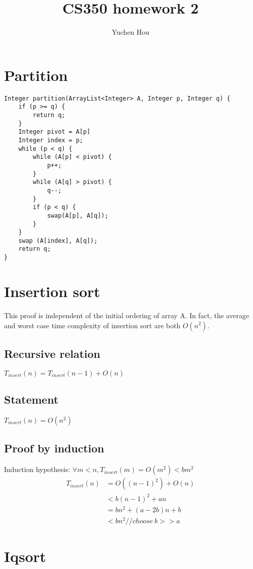 \documentclass{article}
\begin{document}
\lstset{language=Java, tabsize=4}
\title{CS350 homework 2}
\author{Yuchen Hou}
\maketitle

\section{Partition}
\begin{lstlisting}
Integer partition(ArrayList<Integer> A, Integer p, Integer q) {
	if (p >= q) {
		return q;
	}
	Integer pivot = A[p]
	Integer index = p;
	while (p < q) {
		while (A[p] < pivot) {
			p++;
		}
		while (A[q] > pivot) {
			q--;
		}
		if (p < q) {
			swap(A[p], A[q]);
		}
	}
	swap (A[index], A[q]);
	return q;
}
\end{lstlisting}

\section{Insertion sort}
This proof is independent of the initial ordering of array A. In fact, the
average and worst case time complexity of insertion sort are both $O(n^2)$.

\subsection{Recursive relation}
$T_{insert}(n) = T_{insert}(n - 1) + O(n)$

\subsection{Statement}
$T_{insert}(n) = O(n^2)$

\subsection{Proof by induction}
Induction hypothesis: $\forall m < n, T_{insert}(m) = O(m^2) < b m^2$
\begin{align*}
T_{insert}(n)
&= O((n-1)^2) + O(n)\\
&< b(n-1)^2 + an\\
&= b n^2 + (a - 2b)n + b\\
&< b n^2 //choose \ b >> a
\end{align*}

\section{Iqsort}
\end{document}
